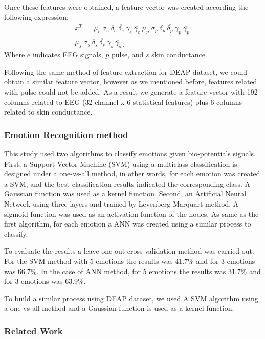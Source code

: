 \documentclass{sig-alternate}
\begin{document}
Once these features were obtained, a feature vector was created according the following 
expression:
\begin{equation}
\begin{split}
x^{T} = [\mu_{e}\ \sigma_{e}\ \delta_{e}\ \overline{\delta_{e}}\ \gamma_{e}\ \overline{\gamma_{e}}\ 
\mu_{p}\ \sigma_{p}\ \delta_{p}\ \overline{\delta_{p}}\ \gamma_{p}\ \overline{\gamma_{p}}\ \\
\mu_{s}\ \sigma_{s}\ \delta_{s}\ \overline{\delta_{s}}\ \gamma_{s}\ \overline{\gamma_{s}}\ ] 
\end{split}
\end{equation}
Where $e$ indicates EEG signals, $p$ pulse, and $s$ skin conductance.

Following the same method of feature extraction for DEAP dataset, 
we could obtain a similar feature vector, however as we mentioned before, 
features related with pulse could not be added. As a result we generate 
a feature vector with 192 columns related to EEG (32 channel x 6 statistical 
features) plus 6 columns related to skin conductance.

\subsubsection{Emotion Recognition method}

This study used two algorithms to classify emotions given bio-potentials signals.
First, a Support Vector Machine (SVM) using a multiclass classification is designed under 
a one-vs-all method, in other words, for each emotion was created a SVM, and the best
classification results indicated the corresponding class. A Gaussian function was used as a kernel function.
Second, an Artificial Neural Network using three layers and trained by Levenberg-Marquart method.
A sigmoid function was used as an activation function of the nodes. As same as the first algorithm,
for each emotion a ANN was created using a similar process to classify.

To evaluate the results a leave-one-out cross-validation method was carried out. 
For the SVM method with 5 emotions the results was 41.7\% and for 3 emotions was 66.7\%.
In the case of ANN method, for 5 emotions the results was 31.7\% and for 3 emotions was
63.9\%.   

To build a similar process using DEAP dataset, we used A SVM algorithm using a
one-vs-all method and a Gaussian function is used as a kernel function. 

\subsubsection{Related Work}
\end{document}
